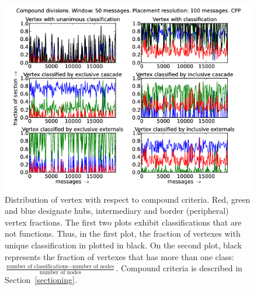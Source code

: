 \documentclass[%
 aip,
 jmp,%
 amsmath,amssymb,
 reprint,%
]{revtex4-1}
\begin{document}
\begin{figure}[hbtp] 
   \centering
        \includegraphics[width=\textwidth]{figs/CPP/50_2}
    \caption{Distribution of vertex with respect to compound criteria. Red, green and blue designate hubs, intermediary and border (peripheral) vertex fractions. The first two plots exhibit classifications that are not functions. Thus, in the first plot, the fraction of vertexes with unique classification in plotted in black. On the second plot, black represents the fraction of vertexes that has more than one class: $\frac{\text{number of classifications} - \text{number of nodes}}{\text{number of nodes}}$. Compound criteria is described in Section~\ref{sectioning}.}
    \label{fig:cpp50_}
\end{figure}
\end{document}
